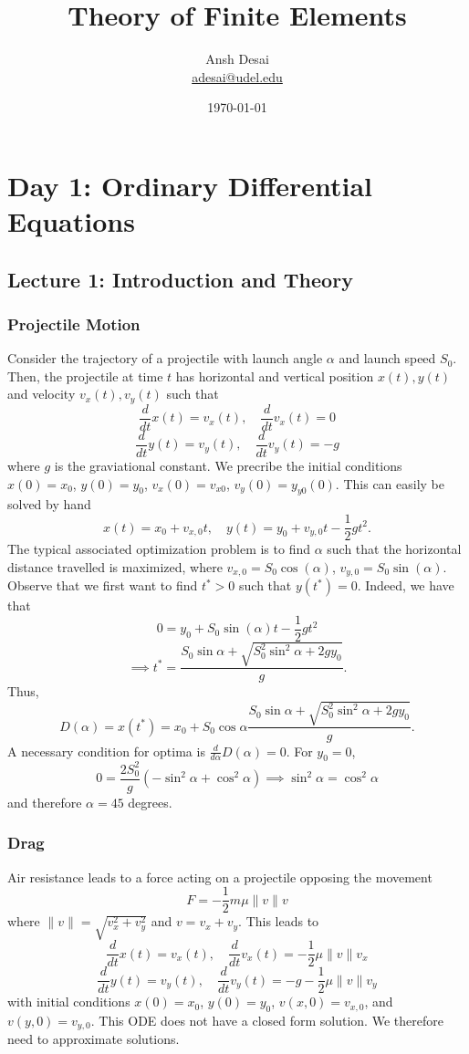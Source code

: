 \documentclass{article}
\title{Theory of Finite Elements}
\author{Ansh Desai \\ \href{mailto:adesai@udel.edu}{adesai@udel.edu}}
\date{\today}
\theoremstyle{definition}
\theoremstyle{definition}
\begin{document}
\maketitle

\tableofcontents

\section{Day 1: Ordinary Differential Equations}
\subsection{Lecture 1: Introduction and Theory}
\subsubsection{Projectile Motion}
Consider the trajectory of a projectile with launch angle $\alpha$ and launch speed $S_0$. Then, the projectile at time $t$ has horizontal and vertical position $x(t),y(t)$ and velocity $v_x(t),v_y(t)$ such that
$$\frac{d}{dt}x(t)=v_x(t),\quad \frac{d}{dt}v_x(t)=0$$
$$\frac{d}{dt}y(t)=v_y(t),\quad \frac{d}{dt}v_y(t)=-g$$
where $g$ is the graviational constant. We precribe the initial conditions $x(0)=x_0$, $y(0)=y_0$, $v_x(0)=v_{x0}$, $v_y(0)=y_{y0}(0)$. This can easily be solved by hand
$$x(t)=x_0+v_{x,0}t,\quad y(t)=y_0+v_{y,0}t-\frac{1}{2}gt^2.$$
The typical associated optimization problem is to find $\alpha$ such that the horizontal distance travelled is maximized, where $v_{x,0}=S_0\cos(\alpha)$, $v_{y,0}=S_0\sin(\alpha)$. Observe that we first want to find $t^*>0$ such that $y(t^*)=0$. Indeed, we have that
$$0=y_0+S_0\sin(\alpha)t-\frac{1}{2}gt^2$$
$$\implies t^*=\frac{S_0\sin\alpha+\sqrt{S_0^2\sin^2\alpha+2gy_0}}{g}.$$
Thus,
$$D(\alpha)=x(t^*)=x_0+S_0\cos\alpha\frac{S_0\sin\alpha+\sqrt{S_0^2\sin^2\alpha+2gy_0}}{g}.$$
A necessary condition for optima is $\frac{d}{d\alpha}D(\alpha)=0$. For $y_0=0$,
$$0=\frac{2S_0^2}{g}(-\sin^2\alpha+\cos^2\alpha) \implies \sin^2\alpha=\cos^2\alpha$$
and therefore $\alpha=45$ degrees.
\subsubsection{Drag}
Air resistance leads to a force acting on a projectile opposing the movement
$$F=-\frac{1}{2}m\mu \|v\|v$$
where $\|v\|=\sqrt{v_x^2+v_y^2}$ and $v=v_x+v_y$. This leads to
$$\frac{d}{dt}x(t)=v_x(t),\quad \frac{d}{dt}v_x(t)=-\frac{1}{2}\mu \|v\|v_x$$
$$\frac{d}{dt}y(t)=v_y(t),\quad \frac{d}{dt}v_y(t)=-g-\frac{1}{2}\mu \|v\|v_y$$
with initial conditions $x(0)=x_0$, $y(0)=y_0$, $v(x,0)=v_{x,0}$, and $v(y,0)=v_{y,0}$. This ODE does not have a closed form solution. We therefore need to approximate solutions.
\end{document}
